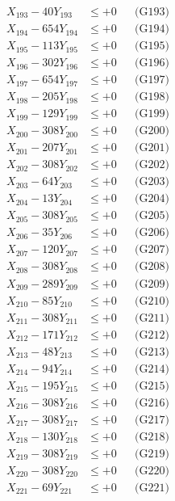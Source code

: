 \documentclass[a4paper,10pt]{article}
\begin{document}
{\begin{align}
X_{193} - 40Y_{193} &\leq +0 && \text{(G193)} \\
X_{194} - 654Y_{194} &\leq +0 && \text{(G194)} \\
X_{195} - 113Y_{195} &\leq +0 && \text{(G195)} \\
X_{196} - 302Y_{196} &\leq +0 && \text{(G196)} \\
X_{197} - 654Y_{197} &\leq +0 && \text{(G197)} \\
X_{198} - 205Y_{198} &\leq +0 && \text{(G198)} \\
X_{199} - 129Y_{199} &\leq +0 && \text{(G199)} \\
X_{200} - 308Y_{200} &\leq +0 && \text{(G200)} \\
\allowbreak
X_{201} - 207Y_{201} &\leq +0 && \text{(G201)} \\
X_{202} - 308Y_{202} &\leq +0 && \text{(G202)} \\
X_{203} - 64Y_{203} &\leq +0 && \text{(G203)} \\
X_{204} - 13Y_{204} &\leq +0 && \text{(G204)} \\
X_{205} - 308Y_{205} &\leq +0 && \text{(G205)} \\
X_{206} - 35Y_{206} &\leq +0 && \text{(G206)} \\
X_{207} - 120Y_{207} &\leq +0 && \text{(G207)} \\
X_{208} - 308Y_{208} &\leq +0 && \text{(G208)} \\
X_{209} - 289Y_{209} &\leq +0 && \text{(G209)} \\
X_{210} - 85Y_{210} &\leq +0 && \text{(G210)} \\
\allowbreak
X_{211} - 308Y_{211} &\leq +0 && \text{(G211)} \\
X_{212} - 171Y_{212} &\leq +0 && \text{(G212)} \\
X_{213} - 48Y_{213} &\leq +0 && \text{(G213)} \\
X_{214} - 94Y_{214} &\leq +0 && \text{(G214)} \\
X_{215} - 195Y_{215} &\leq +0 && \text{(G215)} \\
X_{216} - 308Y_{216} &\leq +0 && \text{(G216)} \\
X_{217} - 308Y_{217} &\leq +0 && \text{(G217)} \\
X_{218} - 130Y_{218} &\leq +0 && \text{(G218)} \\
X_{219} - 308Y_{219} &\leq +0 && \text{(G219)} \\
X_{220} - 308Y_{220} &\leq +0 && \text{(G220)} \\
\allowbreak
X_{221} - 69Y_{221} &\leq +0 && \text{(G221)} \\

\end{align}}
\end{document}
